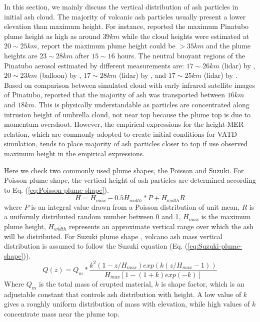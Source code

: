 \documentclass[draft,linenumbers]{agujournal2019}
\begin{document}
In this section, we mainly discuss the vertical distribution of ash particles in initial ash cloud.
The majority of volcanic ash particles usually present a lower elevation than maximum height. For instance, \citet{holasek1996satellite, holasek1996experiments} reported the maximum Pinatubo plume height as high as around $39 km$ while the cloud heights were estimated at $20 \sim 25 km $, \citet{self1993atmospheric} report the maximum plume height could be $>35 km$ and the plume heights are $23 \sim 28 km$ after $15 \sim 16$ hours. The neutral buoyant regions of the Pinatubo aerosol estimated by different measurements are: $17 \sim 26 km$ (lidar) by \citet{defoor1992early}, $20 \sim 23 km$ (balloon) by \citet{deshler1992balloonborne}, $17 \sim 28 km$ (lidar) by \citet{jager1992pinatubo}, and $17 \sim 25 km$ (lidar) by \citet{avdyushin19931}. Based on comparison between simulated cloud with early infrared satellite images of Pinatubo, \citet{fero2008simulation} reported that the majority of ash was transported between $16 km$ and $18 km$. This is physically understandable as particles are concentrated along intrusion height of umbrella cloud, not near top because the plume top is due to momentum overshoot. However, the empirical expressions for the height-MER relation, which are commonly adopted to create initial conditions for VATD simulation, tends to place majority of ash particles closer to top if use observed maximum height in the empirical expressions.

Here we check two commonly used plume shapes, the Poisson and Suzuki.
For Poisson plume shape, the vertical height of ash particles are determined according to Eq. (\ref{eq:Poisson-plume-shape}).
\begin{equation}
H=H_{max} - 0.5 H_{width}*P+H_{width}R
\label{eq:Poisson-plume-shape}
\end{equation}
where $P$ is an integral value drawn from a Poisson distribution of unit mean, $R$ is a uniformly distributed random number between 0 and 1, $H_{max}$ is the maximum plume height, $H_{width}$ represents an approximate vertical range over which the ash will be distributed.
For Suzuki plume shape \citep{suzuki1983theoretical}, volcano ash mass vertical distribution is assumed to follow the Suzuki equation (Eq. (\ref{eq:Suzuki-plume-shape})).
\begin{equation}
Q(z)=Q_m* \frac{k^2(1-z/H_{max})exp\left(k(z/H_{max} -1 )\right)}{H_{max}\left[1-(1+k)exp(-k)\right]}
\label{eq:Suzuki-plume-shape}
\end{equation}
Where $Q_m$ is the total mass of erupted material, $k$ is shape factor, which is an adjustable constant that controls ash distribution with height. A low value of $k$ gives a roughly uniform distribution of mass with elevation, while high values of $k$ concentrate mass near the plume top.
\end{document}
